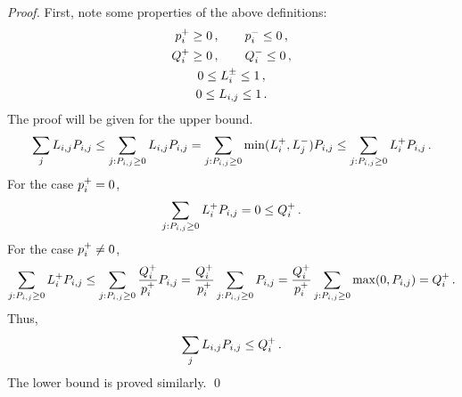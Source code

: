 \begin{proof}
   First, note some properties of the above definitions:
   \begin{gather*}
      p_i^+ \geq 0
        \,, \qquad p_i^- \leq 0 \,,\\
      Q_i^+ \geq 0
        \,, \qquad Q_i^- \leq 0 \,,\\
      0 \leq L_i^\pm \leq 1 \,,\\
      0 \leq L_{i,j} \leq 1 \,.
   \end{gather*}
   The proof will be given for the upper bound.
   \[
      \sumj\limiterletter\ij\correctionfluxij
      \leq \sum\limits_{j:\correctionfluxij\geq 0}
        \limiterletter\ij\correctionfluxij
      = \sum\limits_{j:\correctionfluxij\geq 0}
        \min(\limiterletter_i^+,\limiterletter_j^-)\correctionfluxij
      \leq \sum\limits_{j:\correctionfluxij\geq 0}
        \limiterletter_i^+\correctionfluxij \eqp
   \]
   For the case $p_i^+ = 0$,
   \[
      \sum\limits_{j:\correctionfluxij\geq 0}
        \limiterletter_i^+ \correctionfluxij = 0 \leq \limitedfluxbound_i^+ \eqp
   \]
   For the case $p_i^+ \ne 0$,
   \[
      \sum\limits_{j:\correctionfluxij\geq 0} \limiterletter_i^+\correctionfluxij
      \leq \sum\limits_{j:\correctionfluxij\geq 0}\frac{\limitedfluxbound_i^+}
        {\correctionfluxletter_i^+}\correctionfluxij
      = \frac{\limitedfluxbound_i^+}{\correctionfluxletter_i^+}
        \sum\limits_{j:\correctionfluxij\geq 0} \correctionfluxij
      = \frac{\limitedfluxbound_i^+}{\correctionfluxletter_i^+}
        \sum\limits_{j:\correctionfluxij\geq 0} \max(0,\correctionfluxij)
      = \limitedfluxbound_i^+ \eqp
   \]
   Thus,
   \[
      \sumj \limiterletter\ij\correctionfluxij \leq \limitedfluxbound_i^+ \eqp
   \]
   The lower bound is proved similarly.
   \qed
\end{proof}
